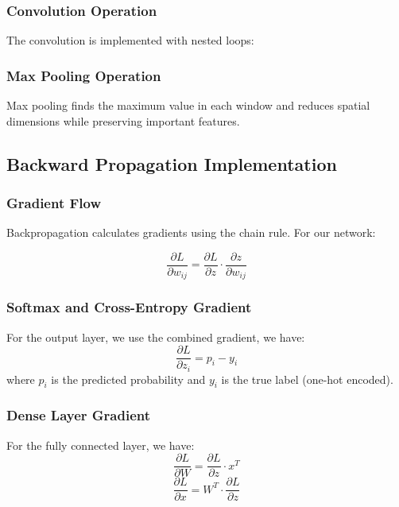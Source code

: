 \documentclass[conference]{IEEEtran}
\begin{document}
\subsubsection{Convolution Operation}
The convolution is implemented with nested loops:


\subsubsection{Max Pooling Operation}
Max pooling finds the maximum value in each window and reduces spatial dimensions while preserving important features.

\subsection{Backward Propagation Implementation}

\subsubsection{Gradient Flow}
Backpropagation calculates gradients using the chain rule. For our network:

\begin{equation}
    \frac{\partial L}{\partial w_{ij}} = \frac{\partial L}{\partial z} \cdot \frac{\partial z}{\partial w_{ij}}
\end{equation}


\subsubsection{Softmax and Cross-Entropy Gradient}
For the output layer, we use the combined gradient, we have:
\begin{equation}
    \frac{\partial L}{\partial z_i} = p_i - y_i
\end{equation}
where $p_i$ is the predicted probability and $y_i$ is the true label (one-hot encoded).

\subsubsection{Dense Layer Gradient}
For the fully connected layer, we have:
\begin{equation}
    \frac{\partial L}{\partial W} = \frac{\partial L}{\partial z} \cdot x^T
\end{equation}
\begin{equation}
    \frac{\partial L}{\partial x} = W^T \cdot \frac{\partial L}{\partial z}
\end{equation}
\end{document}
